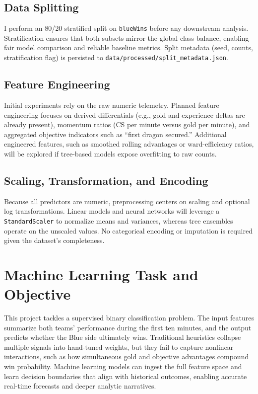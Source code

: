 \documentclass[aps,prl,preprint,groupedaddress]{revtex4-2}
\begin{document}
\subsection{Data Splitting}
I perform an 80/20 stratified split on \texttt{blueWins} before any downstream analysis. Stratification ensures that both subsets mirror the global class balance, enabling fair model comparison and reliable baseline metrics. Split metadata (seed, counts, stratification flag) is persisted to \texttt{data/processed/split\_metadata.json}.

\subsection{Feature Engineering}
Initial experiments rely on the raw numeric telemetry. Planned feature engineering focuses on derived differentials (e.g., gold and experience deltas are already present), momentum ratios (CS per minute versus gold per minute), and aggregated objective indicators such as ``first dragon secured.'' Additional engineered features, such as smoothed rolling advantages or ward-efficiency ratios, will be explored if tree-based models expose overfitting to raw counts.

\subsection{Scaling, Transformation, and Encoding}
Because all predictors are numeric, preprocessing centers on scaling and optional log transformations. Linear models and neural networks will leverage a \texttt{StandardScaler} to normalize means and variances, whereas tree ensembles operate on the unscaled values. No categorical encoding or imputation is required given the dataset's completeness.

\section{Machine Learning Task and Objective}
\label{sec:ml_task}

This project tackles a supervised binary classification problem. The input features summarize both teams' performance during the first ten minutes, and the output predicts whether the Blue side ultimately wins. Traditional heuristics collapse multiple signals into hand-tuned weights, but they fail to capture nonlinear interactions, such as how simultaneous gold and objective advantages compound win probability. Machine learning models can ingest the full feature space and learn decision boundaries that align with historical outcomes, enabling accurate real-time forecasts and deeper analytic narratives.
\end{document}
